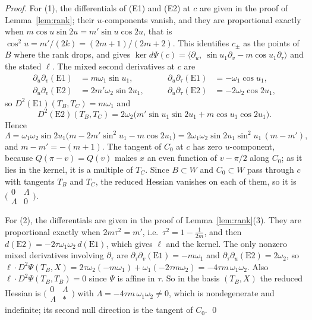 \begin{proof}
For (1), the differentials of (E1) and (E2) at $c$ are given in the proof of Lemma~\ref{lem:rank}; their
$u$-components vanish, and they are proportional exactly when $m\cos u\sin2u=m'\sin u\cos2u$, that is
$\cos^2u=m'/(2k)=(2m+1)/(2m+2)$. This identifies $c_\pm$ as the points of $B$ where the rank drops, and gives
$\ker d\Psi(c)=\langle\partial_u,\ \sin u_1\partial_v-m\cos u_1\partial_\tau\rangle$ and the stated $\ell$. The mixed second
derivatives at $c$ are
\[
\begin{aligned}
\partial_u\partial_v(\mathrm{E1})&=m\omega_1\sin u_1,&\qquad\partial_u\partial_\tau(\mathrm{E1})&=-\omega_1\cos u_1,\\
\partial_u\partial_v(\mathrm{E2})&=2m'\omega_2\sin2u_1,&\qquad\partial_u\partial_\tau(\mathrm{E2})&=-2\omega_2\cos2u_1,
\end{aligned}
\]
so $D^2(\mathrm{E1})(T_B,T_C)=m\omega_1$ and
\[
D^2(\mathrm{E2})(T_B,T_C)=2\omega_2\bigl(m'\sin u_1\sin2u_1+m\cos u_1\cos2u_1\bigr).
\]
Hence
\[
\Lambda=\omega_1\omega_2\sin2u_1\bigl(m-2m'\sin^2u_1-m\cos2u_1\bigr)=2\omega_1\omega_2\sin2u_1\sin^2u_1\,(m-m'),
\]
and $m-m'=-(m+1)$. The tangent of $C_0$ at $c$ has zero $u$-component, because $Q(\pi-v)=Q(v)$ makes $x$ an even
function of $v-\pi/2$ along $C_0$; as it lies in the kernel, it is a multiple of $T_C$. Since $B\subset W$ and $C_0\subset W$
pass through $c$ with tangents $T_B$ and $T_C$, the reduced
Hessian vanishes on each of them, so it is $\bigl(\begin{smallmatrix}0&\Lambda\\\Lambda&0\end{smallmatrix}\bigr)$.

For (2), the differentials are given in the proof of Lemma~\ref{lem:rank}(3). They are proportional exactly when
$2m\tau^2=m'$, i.e.\ $\tau^2=1-\frac1{2m}$, and then $d(\mathrm{E2})=-2\tau\omega_1\omega_2\,d(\mathrm{E1})$, which gives $\ell$ and
the kernel. The only nonzero mixed derivatives involving $\partial_\tau$ are $\partial_\tau\partial_v(\mathrm{E1})=-m\omega_1$ and
$\partial_\tau\partial_u(\mathrm{E2})=2\omega_2$, so
$\ell\cdot D^2\Psi(T_B,X)=2\tau\omega_2(-m\omega_1)+\omega_1(-2\tau m\omega_2)=-4\tau m\,\omega_1\omega_2$. Also
$\ell\cdot D^2\Psi(T_B,T_B)=0$ since $\Psi$ is affine in $\tau$. So in the basis $(T_B,X)$ the reduced Hessian is
$\bigl(\begin{smallmatrix}0&\Lambda\\\Lambda&*\end{smallmatrix}\bigr)$ with $\Lambda=-4\tau m\,\omega_1\omega_2\neq0$, which is nondegenerate and indefinite; its
second null direction is the tangent of $C_0$. \qed
\end{proof}

